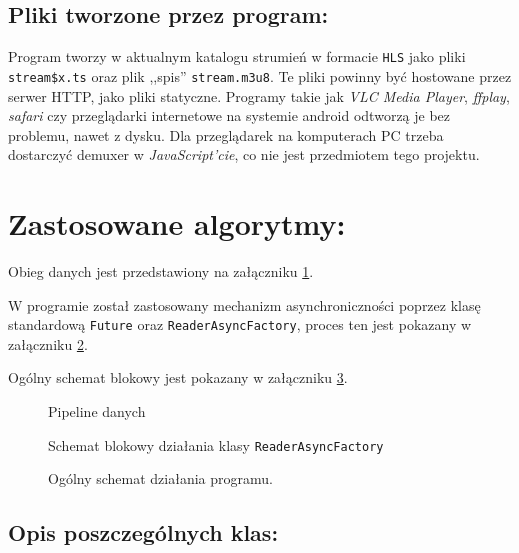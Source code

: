 \documentclass[a4paper,12pt]{article}
\begin{document}
\subsection*{Pliki tworzone przez program:}

Program tworzy w aktualnym katalogu strumień w formacie \texttt{HLS} jako pliki
\texttt{stream\$x.ts} oraz plik ,,spis'' \texttt{stream.m3u8}. Te pliki powinny
być hostowane przez serwer HTTP, jako pliki statyczne. Programy takie jak
\emph{VLC Media Player}, \emph{ffplay}, \emph{safari} czy przeglądarki
internetowe na systemie android odtworzą je bez problemu, nawet z dysku. Dla
przeglądarek na komputerach PC trzeba dostarczyć demuxer w
\emph{JavaScript'cie}, co nie jest przedmiotem tego projektu.


\section{Zastosowane algorytmy:}

Obieg danych jest przedstawiony na załączniku \ref{rys:pipeline}.

W programie został zastosowany mechanizm asynchroniczności poprzez klasę
standardową \texttt{Future} oraz \texttt{ReaderAsyncFactory}, proces ten jest
pokazany w załączniku \ref{rys:reader}. 

Ogólny schemat blokowy jest pokazany w załączniku \ref{rys:program}.

\begin{figure}[p]
    \resizebox{.3\textwidth}{!}{%
    }
    \centering
    \caption{Pipeline danych}
    \label{rys:pipeline}
\end{figure}

\begin{figure}[t]
    \resizebox{.5\textwidth}{!}{%
    }
    \centering
    \caption{Schemat blokowy działania klasy \texttt{ReaderAsyncFactory}}
    \label{rys:reader}
\end{figure}

\begin{figure}[p]
    \resizebox{.54\textwidth}{!}{%
    }
    \centering
    \caption{Ogólny schemat działania programu.}
    \label{rys:program}
\end{figure}

\subsection*{Opis poszczególnych klas:}
\end{document}

